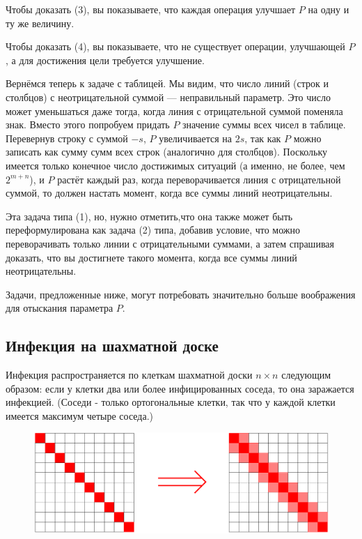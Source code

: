 Чтобы доказать (3), вы показываете, что каждая операция улучшает $P$ на одну и ту же величину.

Чтобы доказать (4), вы показываете, что не существует операции, улучшающей $P$, а для достижения цели требуется улучшение.

\smallskip

Вернёмся теперь к задаче с таблицей.
Мы видим, что число линий (строк и столбцов) с неотрицательной суммой --- неправильный параметр.
Это число может уменьшаться даже тогда, когда линия с отрицательной суммой поменяла знак.
Вместо этого попробуем придать $P$ значение суммы всех чисел в таблице.
Перевернув строку с суммой $-s$, $P$ увеличивается на $2s$, так как $P$ можно записать как сумму сумм всех строк (аналогично для столбцов).
Поскольку имеется только конечное число достижимых ситуаций
(а именно, не более, чем $2^{m+n}$), и $P$ растёт каждый раз, когда переворачивается линия с отрицательной суммой, то должен настать момент, когда все суммы линий неотрицательны.

Эта задача типа (1), но, нужно отметить,что она также может быть переформулирована как задача (2) типа, добавив условие, что можно переворачивать только линии с отрицательными суммами, а затем спрашивая доказать, что вы достигнете такого момента, когда все суммы линий неотрицательны.

\medskip

Задачи, предложенные ниже, могут потребовать значительно больше воображения для отыскания параметра $P$.

\subsection*{Инфекция на шахматной доске}%

Инфекция распространяется по клеткам шахматной доски $n \times n$ следующим образом: если у клетки два или более инфицированных соседа, то она заражается инфекцией.
(Соседи - только ортогональные клетки, так что у каждой клетки имеется максимум четыре соседа.)

\begin{figure}
\centering
\includegraphics[scale=0.6]{Figs/Algorithms/diag}
\end{figure}

